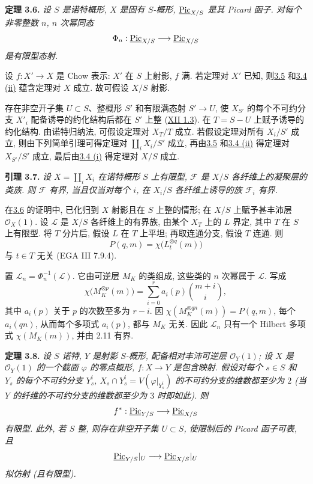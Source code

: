 \textbf{定理 3.6.} \emph{设 \(S\) 是诺特概形, \(X\) 是固有 \(S\)-概形, \(\underline{\operatorname{Pic}}_{X/S}\) 是其 Picard 函子. 对每个非零整数 \(n\), \(n\) 次幂同态}
\[
\Phi_n:\underline{\operatorname{Pic}}_{X/S}\longrightarrow\underline{\operatorname{Pic}}_{X/S}
\]
\emph{是有限型态射.}

设 \(f:X'\to X\) 是 Chow 表示: \(X'\) 在 \(S\) 上射影, \(f\) 满. 若定理对 \(X'\) 已知, 则\hyperlink{sga6.e13.thm.3-5}{3.5} 和\hyperlink{sga6.e13.lem.3-4}{3.4 (ii)} 蕴含定理对 \(X\) 成立. 故可假设 \(X/S\) 射影.

存在非空开子集 \(U\subset S\)、整概形 \(S'\) 和有限满态射 \(S'\to U\), 使 \(X_{S'}\) 的每个不可约分支 \(X'_i\) 配备诱导的约化结构后都在 \(S'\) 上整 (\hyperlink{sga6.e12.lem.1-3}{XII 1.3}). 在 \(T=S-U\) 上赋予诱导的约化结构. 由诺特归纳法, 可假设定理对 \(X_T/T\) 成立. 若假设定理对所有 \(X_i/S'\) 成立, 则由下列简单引理可得定理对 \(\coprod_iX_i/S'\) 成立, 再由\hyperlink{sga6.e13.thm.3-5}{3.5} 和\hyperlink{sga6.e13.lem.3-4}{3.4 (ii)} 得定理对 \(X_{S'}/S'\) 成立, 最后由\hyperlink{sga6.e13.lem.3-4}{3.4 (i)} 得定理对 \(X/S\) 成立.

\textbf{引理 3.7.} \emph{设 \(X=\coprod_iX_i\) 在诺特概形 \(S\) 上有限型, \(\mathcal F\) 是 \(X/S\) 各纤维上的凝聚层的类族. 则 \(\mathcal F\) 有界, 当且仅当对每个 \(i\), 在 \(X_i/S\) 各纤维上诱导的族 \(\mathcal F_i\) 有界.}

在\hyperlink{sga6.e13.thm.3-6}{3.6} 的证明中, 已化归到 \(X\) 射影且在 \(S\) 上整的情形; 在 \(X/S\) 上赋予甚丰沛层 \(\mathcal O_X(1)\). 设 \(\mathscr L\) 是 \(X/S\) 各纤维上的有界族, 由某个 \(X_T\) 上的 \(L\) 界定, 其中 \(T\) 在 \(S\) 上有限型. 将 \(T\) 分片后, 假设 \(L\) 在 \(T\) 上平坦; 再取连通分支, 假设 \(T\) 连通. 则
\[
P(q,m)=\chi\bigl(L_t^{\otimes q}(m)\bigr)
\]
与 \(t\in T\) 无关 (EGA III 7.9.4).

置 \(\mathscr L_n=\Phi_n^{-1}(\mathscr L)\). 它由可逆层 \(M_K\) 的类组成, 这些类的 \(n\) 次幂属于 \(\mathscr L\). 写成
\[
\chi\bigl(M_K^{\otimes p}(m)\bigr)
=\sum_{i=0}^{r}a_i(p)\binom{m+i}{i},
\]
其中 \(a_i(p)\) 关于 \(p\) 的次数至多为 \(r-i\). 因 \(\chi(M_K^{\otimes qn}(m))=P(q,m)\), 每个 \(a_i(qn)\), 从而每个多项式 \(a_i(p)\), 都与 \(M_K\) 无关. 因此 \(\mathscr L_n\) 只有一个 Hilbert 多项式 \(\chi(M_K(m))\), 并由 2.11 有界.

\textbf{定理 3.8.} \emph{设 \(S\) 诺特, \(Y\) 是射影 \(S\)-概形, 配备相对丰沛可逆层 \(\mathcal O_Y(1)\); 设 \(X\) 是 \(\mathcal O_Y(1)\) 的一个截面 \(\varphi\) 的零点概形, \(f:X\to Y\) 是包含映射. 假设对每个 \(s\in S\) 和 \(Y_s\) 的每个不可约分支 \(Y_s^i\), \(X_s\cap Y_s^i=V(\varphi|_{Y_s^i})\) 的不可约分支的维数都至少为 \(2\) (当 \(Y\) 的纤维的不可约分支的维数都至少为 \(3\) 时即如此). 则}
\[
f^*:\underline{\operatorname{Pic}}_{Y/S}\longrightarrow\underline{\operatorname{Pic}}_{X/S}
\]
\emph{有限型. 此外, 若 \(S\) 整, 则存在非空开子集 \(U\subset S\), 使限制后的 Picard 函子可表, 且}
\[
\underline{\operatorname{Pic}}_{Y/S}|_U\longrightarrow\underline{\operatorname{Pic}}_{X/S}|_U
\]
\emph{拟仿射 (且有限型).}

